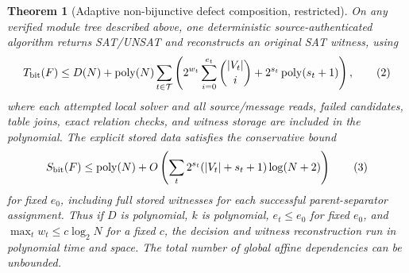 \documentclass[10pt]{article}
\newtheorem{theorem}{Theorem}
\begin{document}
\begin{theorem}[Adaptive non-bijunctive defect composition, restricted]\label{th:hybrid}
On any verified module tree described above, one deterministic source-authenticated algorithm returns SAT/UNSAT and reconstructs an original SAT witness, using
\[
 T_{\rm bit}(F) \le D(N)+\operatorname{poly}(N)\sum_{t\in\mathcal T}
 \left(2^{w_t}\sum_{i=0}^{e_t}\binom{|V_t|}{i}
 +2^{s_t}\operatorname{poly}(s_t+1)\right),\tag{2}
\]
where each attempted local solver and all source/message reads, failed candidates, table joins, exact relation checks, and witness storage are included in the polynomial. The explicit stored data satisfies the conservative bound
\[
 S_{\rm bit}(F) \le \operatorname{poly}(N)+
 O\left(\sum_t 2^{s_t}(|V_t|+s_t+1)\log(N+2)\right)\tag{3}
\]
for fixed $e_0$, including full stored witnesses for each successful parent-separator assignment. Thus if $D$ is polynomial, $k$ is polynomial, $e_t\le e_0$ for fixed $e_0$, and $\max_t w_t\le c\log_2 N$ for a fixed $c$, the decision and witness reconstruction run in polynomial time and space. The total number of global affine dependencies can be unbounded.
\end{theorem}
\end{document}
